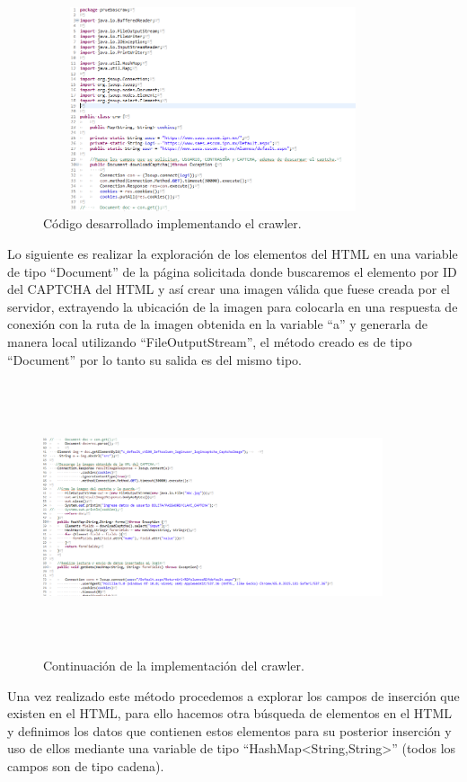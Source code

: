 		\begin{figure} [hbt!]
			\centering
			\includegraphics[width=10cm, height=6cm]{Imagenes/Crawler/Codigo1}
			\caption{Código desarrollado implementando el crawler.}
			\label{codigo1}
		\end{figure}
		
		\noindent Lo siguiente es realizar la exploración de los elementos del HTML en una variable de tipo “Document” de la página solicitada donde buscaremos el elemento por ID del CAPTCHA del HTML y así crear una imagen válida que fuese creada por el servidor, extrayendo la ubicación de la imagen para colocarla en una respuesta de conexión con la ruta de la imagen obtenida en la variable “a” y generarla de manera local utilizando “FileOutputStream”, el método creado es de tipo “Document” por lo tanto su salida es del mismo tipo. 
\pagebreak
		
		\begin{figure} [hbt!]
			\centering
			\includegraphics[width=10cm, height=8cm]{Imagenes/Crawler/Codigo2}
			\caption{Continuación de la implementación del crawler.}
			\label{codigo2}
		\end{figure}
		
		\noindent Una vez realizado este método procedemos a explorar los campos de inserción que existen en el HTML, para ello hacemos otra búsqueda de elementos en el HTML y definimos los datos que contienen estos elementos para su posterior inserción y uso de ellos mediante una variable de tipo “HashMap<String,String>” (todos los campos son de tipo cadena).\\
		
